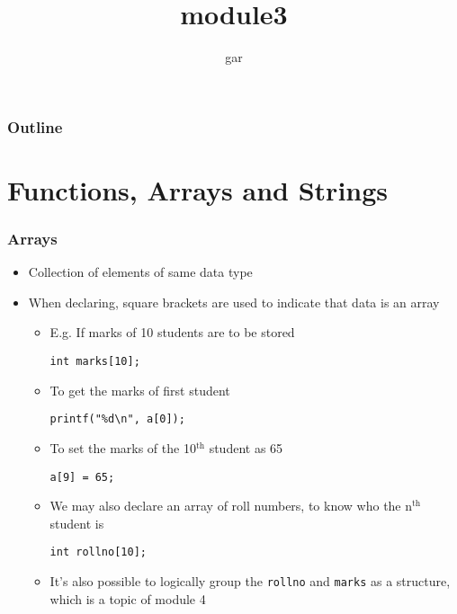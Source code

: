 \documentclass[11pt]{beamer}
\title{module3}
\author{gar}
\date{}
\begin{document}
\maketitle

\begin{frame}
\frametitle{Outline}
\setcounter{tocdepth}{3}
\tableofcontents
\end{frame}
\section{Functions, Arrays and Strings}
\label{sec-1}
\begin{frame}[fragile]\frametitle{Arrays}
\label{sec-1-1}

\begin{itemize}
\item Collection of elements of same data type
\item When declaring, square brackets are used to indicate that data is an array
\begin{itemize}
\item E.g. If marks of 10 students are to be stored

\begin{verbatim}
int marks[10];
\end{verbatim}
\item To get the marks of first student

\begin{verbatim}
printf("%d\n", a[0]);
\end{verbatim}
\item To set the marks of the 10$^{\mathrm{th}}$ student as 65

\begin{verbatim}
a[9] = 65;
\end{verbatim}
\item We may also declare an array of roll numbers, to know who the n$^{\mathrm{th}}$ student is

\begin{verbatim}
int rollno[10];
\end{verbatim}
\item It's also possible to logically group the \verb~rollno~ and \verb~marks~ as a structure, which is a topic of module 4
\end{itemize}
\end{itemize}
\end{frame}
\end{document}
